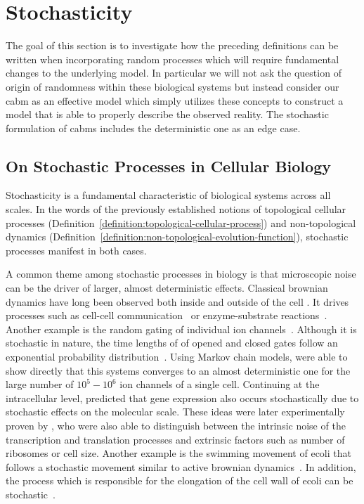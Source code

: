 \section{Stochasticity}
\label{section:stochasticity}
The goal of this section is to investigate how the preceding definitions can be written when
incorporating random processes which will require fundamental changes to the underlying model.
In particular we will not ask the question of origin of randomness within these biological systems
but instead consider our \ac{cabm} as an effective model which simply utilizes these concepts to
construct a model that is able to properly describe the observed reality.
The stochastic formulation of \acp{cabm} includes the deterministic one as an edge case.

\subsection{On Stochastic Processes in Cellular Biology}
Stochasticity is a fundamental characteristic of biological systems across all scales.
In the words of the previously established notions of topological cellular processes
(Definition~\ref{definition:topological-cellular-process})
and non-topological dynamics (Definition~\ref{definition:non-topological-evolution-function}),
stochastic processes manifest in both cases.

A common theme among stochastic processes in biology is that microscopic noise can be the driver of
larger, almost deterministic effects.
Classical brownian dynamics have long been observed both inside and outside of the cell
\cite{Peskin1993,Svoboda1993}.
It drives processes such as cell-cell communication~\cite{CRICK1970} or enzyme-substrate
reactions~\cite{Alberty1958,Schurr1970}.
Another example  is the random gating of individual ion channels~\cite{NEHER1976}.
Although it is stochastic in nature, the time lengths of of opened and closed gates follow an
exponential probability distribution~\cite{Colquhoun1981}.
Using Markov chain models, \citet{Colquhoun1981} were able to show directly that this systems
converges to an almost deterministic one for the large number of $10^5-10^6$ ion channels of a
single cell.
Continuing at the intracellular level, \citet{McAdams1997} predicted that gene expression also
occurs stochastically due to stochastic effects on the molecular scale.
These ideas were later experimentally proven by \citet{Elowitz2002}, who were also able to
distinguish between the intrinsic noise of the transcription and translation processes and extrinsic
factors such as number of ribosomes or cell size.
Another example is the swimming movement of \ac{ecoli} that follows a stochastic movement similar to
active brownian dynamics~\cite{Lee2019,Taute2015}.
In addition, the process which is responsible for the elongation of the cell wall of \ac{ecoli} can
be stochastic~\cite{Kiviet2014}.

